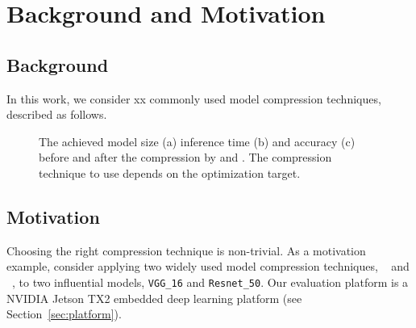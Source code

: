 
\section{Background and Motivation}
\subsection{Background}
In this work, we consider xx commonly used model compression techniques, described as follows.




\begin{figure}[!t]
\centering
{}
\hfill
{}
\hfill
{}
\caption{The achieved model size (a) inference time (b) and accuracy (c) before and after the compression by \quantization and \pruning.
The compression technique to use depends on the optimization target.}
\label{fig:motivation}
\end{figure}

\subsection{Motivation}
Choosing the right compression technique is non-trivial. As a motivation example, consider applying two widely used model compression
techniques, \pruning~\cite{manessi2017automated} and \dquantization~\cite{}, to two influential \CNN models, \texttt{VGG\_16} 	and
\texttt{Resnet\_50}. Our evaluation platform is a NVIDIA Jetson TX2 embedded deep learning platform (see Section~\ref{sec:platform}).

